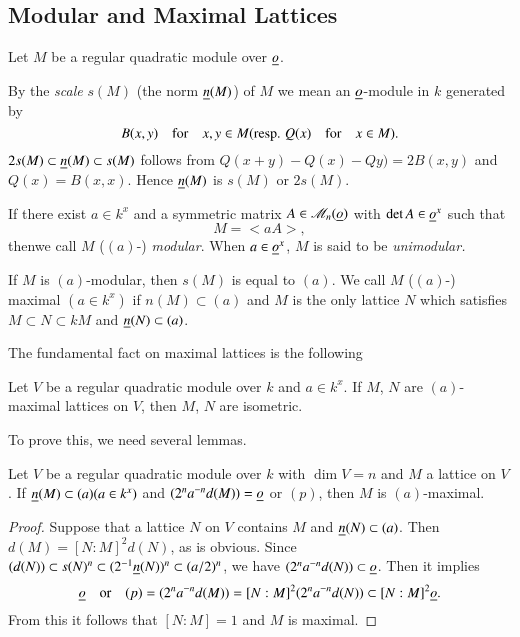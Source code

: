 \subsection{Modular and Maximal Lattices}\label{c2:subsec2.1.2}

Let $M$ be a regular quadratic module over $\underline{o}$.

By the {\em scale} $s(M)$ (\resp the norm $\underline{n}(M)$) of $M$ we mean
an $\underline{o}$-module in $k$ generated by
$$
B(x,y)\quad\text{for}\quad x,y\in M(\text{{resp.}\kern.3em} Q(x) \quad\text{for}\quad
x\in M).
$$
$2s(M)\subset \underline{n}(M)\subset s(M)$ follows from
$Q(x+y)-Q(x)-Qy)=2B(x,y)$ and $Q(x)=B(x,x)$. Hence $\underline{n}(M)$ is
$s(M)$ or $2s(M)$.

If there exist $a\in k^{x}$ and a symmetric matrix
$A\in\mathscr{M}_{n}(\underline{o})$ with $\det A\in\underline{o}^{x}$ such that
$$
M=<aA>,
$$
then\pageoriginale we call $M$ ($(a)$-) {\em modular}. When
$a\in\underline{o}^{x}$, $M$ is said to be {\em unimodular.}

If $M$ is $(a)$-modular, then $s(M)$ is equal to $(a)$. We call $M$
($(a)$-) maximal $(a\in k^{x})$ if $n(M)\subset (a)$ and $M$ is the
only lattice $N$ which satisfies $M\subset N\subset kM$ and
$\underline{n}(N)\subset (a)$.

The fundamental fact on maximal lattices is the following

\begin{theorem}\label{c2:thm-2.2}
Let $V$ be a regular quadratic module over $k$ and $a\in k^{x}$. If
$M$, $N$ are $(a)$-maximal lattices on $V$, then $M$, $N$ are isometric.
\end{theorem}

To prove this, we need several lemmas.

\begin{lemma}\label{c2:lem-2.3}
Let $V$ be a regular quadratic module over $k$ with $\dim V=n$ and $M$
a lattice on $V$. If $\underline{n}(M)\subset (a)(a\in k^{x})$ and
$(2^{n}a^{-n}d(M))=\underline{o}$ or $(p)$, then $M$ is $(a)$-maximal.
\end{lemma}

\begin{proof}
Suppose that a lattice $N$ on $V$ contains $M$ and $\underline{n}(N)\subset
(a)$. Then $d(M)=[N:M]^{2}d(N)$, as is obvious. Since $(d(N))\subset
s(N)^{n}\subset (2^{-1}\break\ub{n}(N))^{n}\subset (a/2)^{n}$, we have
$(2^{n}a^{-n}d(N))\subset\underline{o}$. Then it implies
$$
\underline{o}\quad\text{or}\quad
(p)=(2^{n}a^{-n}d(M))=[N:M]^{2}(2^{n}a^{-n}d(N))\subset
   [N:M]^{2}\underline{o}.
$$
From this it follows that $[N:M]=1$ and $M$ is maximal.
\end{proof}


